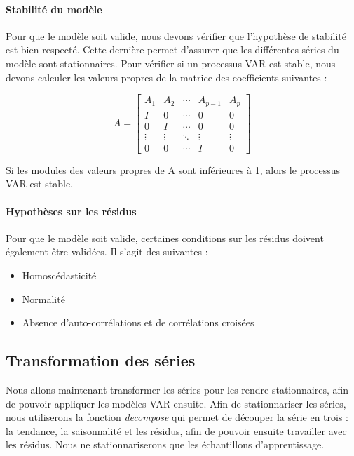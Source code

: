 \documentclass[11pt,]{article}
\providecommand{\tightlist}{%
  \setlength{\itemsep}{0pt}\setlength{\parskip}{0pt}}
\let\oldparagraph\paragraph
\renewcommand{\paragraph}[1]{\oldparagraph{#1}\mbox{}}
\begin{document}
\paragraph{Stabilité du modèle}\label{stabilite-du-modele}

Pour que le modèle soit valide, nous devons vérifier que l'hypothèse de
stabilité est bien respecté. Cette dernière permet d'assurer que les
différentes séries du modèle sont stationnaires. Pour vérifier si un
processus VAR est stable, nous devons calculer les valeurs propres de la
matrice des coefficients suivantes :

\[A = \begin{bmatrix}
A_1 & A_2 & \cdots & A_{p-1} & A_p \\
I & 0 & \cdots & 0 & 0 \\
0 & I & \cdots & 0 & 0 \\
\vdots & \vdots & \ddots & \vdots & \vdots \\
0 & 0 & \cdots & I & 0 
\end{bmatrix}\]

Si les modules des valeurs propres de A sont inférieures à 1, alors le
processus VAR est stable.

\paragraph{Hypothèses sur les résidus}\label{hypotheses-sur-les-residus}

Pour que le modèle soit valide, certaines conditions sur les résidus
doivent également être validées. Il s'agit des suivantes :

\begin{itemize}
\tightlist
\item
  Homoscédasticité
\item
  Normalité
\item
  Absence d'auto-corrélations et de corrélations croisées
\end{itemize}

\subsection{Transformation des séries}\label{transformation-des-series}

Nous allons maintenant transformer les séries pour les rendre
stationnaires, afin de pouvoir appliquer les modèles VAR ensuite. Afin
de stationnariser les séries, nous utiliserons la fonction
\emph{decompose} qui permet de découper la série en trois : la tendance,
la saisonnalité et les résidus, afin de pouvoir ensuite travailler avec
les résidus. Nous ne stationnariserons que les échantillons
d'apprentissage.
\end{document}
